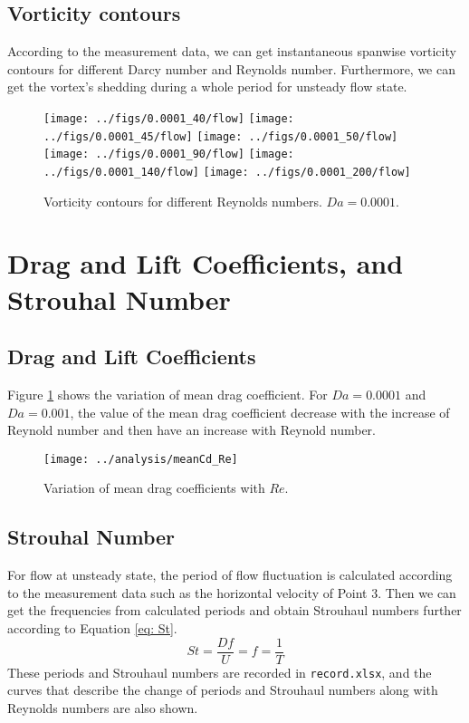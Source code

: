 \subsection{Vorticity contours}
According to the measurement data, we can get instantaneous spanwise vorticity contours for different Darcy number and Reynolds number. Furthermore, we can get the vortex's shedding during a whole period for unsteady flow state.

\begin{figure}[H]
	\centering
	{\texttt{[image: ../figs/0.0001\_40/flow]}}
	{\texttt{[image: ../figs/0.0001\_45/flow]}}
	{\texttt{[image: ../figs/0.0001\_50/flow]}}
	{\texttt{[image: ../figs/0.0001\_90/flow]}}
	{\texttt{[image: ../figs/0.0001\_140/flow]}}
	{\texttt{[image: ../figs/0.0001\_200/flow]}}
	\caption{Vorticity contours for different Reynolds numbers.
		$Da=0.0001$.}
\end{figure}


\section{Drag and Lift Coefficients, and Strouhal Number}
\subsection{Drag and Lift Coefficients}
Figure \ref{fig: meanCd} shows the variation of mean drag coefficient. For $Da=0.0001$ and $Da=0.001$, the value of the mean drag coefficient decrease with the increase of Reynold number and then have an increase with Reynold number.

\begin{figure}[H]
	\centering
	\texttt{[image: ../analysis/meanCd\_Re]}
	\caption{Variation of mean drag coefficients with $Re$.}
	\label{fig: meanCd}
\end{figure}

\subsection{Strouhal Number}
For flow at unsteady state, the period of flow fluctuation is calculated according to the measurement data such as the horizontal velocity of Point 3. Then we can get the frequencies from calculated periods and obtain Strouhaul numbers further according to Equation \ref{eq: St}.
\begin{equation}\label{eq: St}
St = \frac{Df}{U} = f = \frac{1}{T}
\end{equation}
These periods and Strouhaul numbers are recorded in \texttt{record.xlsx}, and the curves that describe the change of periods and Strouhaul numbers along with Reynolds numbers are also shown.

